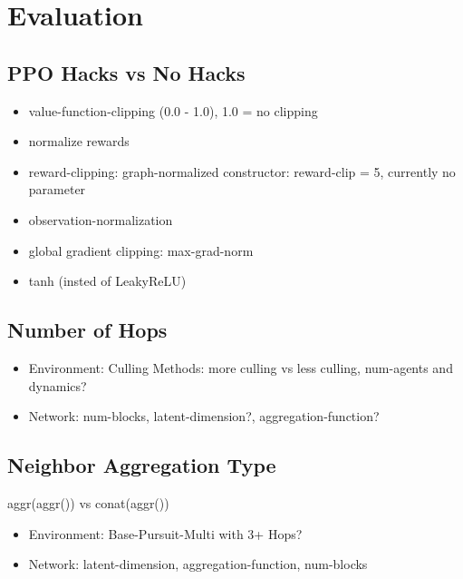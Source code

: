 
\chapter{Evaluation}
\section{PPO Hacks vs No Hacks}
\begin{itemize}[noitemsep,nolistsep]
    \item value-function-clipping (0.0 - 1.0), 1.0 = no clipping
    \item normalize rewards
    \item reward-clipping: graph-normalized constructor: reward-clip = 5, currently no parameter
    \item observation-normalization
    \item global gradient clipping: max-grad-norm
    \item tanh (insted of LeakyReLU)
\end{itemize}

\section{Number of Hops}
\begin{itemize}[noitemsep,nolistsep]
    \item Environment: Culling Methods: more culling vs less culling, num-agents and dynamics?
    \item Network: num-blocks, latent-dimension?, aggregation-function?
\end{itemize}

\section{Neighbor Aggregation Type}
aggr(aggr()) vs conat(aggr())
\begin{itemize}[noitemsep,nolistsep]
    \item Environment: Base-Pursuit-Multi with 3+ Hops?
    \item Network: latent-dimension, aggregation-function, num-blocks
\end{itemize}

